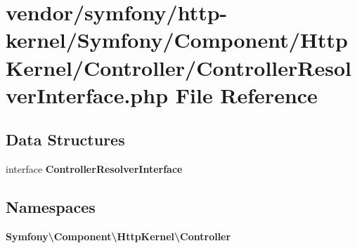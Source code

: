 \section{vendor/symfony/http-\/kernel/\+Symfony/\+Component/\+Http\+Kernel/\+Controller/\+Controller\+Resolver\+Interface.php File Reference}
\label{_controller_resolver_interface_8php}
\subsection*{Data Structures}
\begin{DoxyCompactItemize}
\item 
interface {\bf Controller\+Resolver\+Interface}
\end{DoxyCompactItemize}
\subsection*{Namespaces}
\begin{DoxyCompactItemize}
\item 
 {\bf Symfony\textbackslash{}\+Component\textbackslash{}\+Http\+Kernel\textbackslash{}\+Controller}
\end{DoxyCompactItemize}
